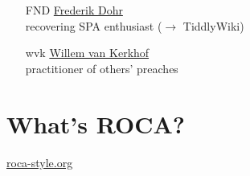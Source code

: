 \documentclass{beamer}
\begin{document}
\begin{frame}{\insertsectionhead}
  \begin{itemize}
    \item[FND] \href{mailto:fnd@innoq.com}{Frederik Dohr} \\
        recovering SPA enthusiast (\ensuremath{\rightarrow} TiddlyWiki)
    \item[]
    \item[wvk] \href{mailto:wvk@innoq.com}{Willem van Kerkhof} \\
        practitioner of others' preaches
  \end{itemize}


\end{frame}

\section{What's ROCA?}

{
  \begin{frame}
    \vspace*{-6.4cm}
    \href{http://roca-style.org}{roca-style.org}

  \end{frame}
}
\end{document}
